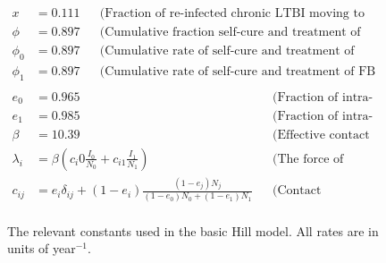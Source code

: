 \documentclass{amsart}
\renewcommand{\(}{\left(}
\renewcommand{\)}{\right)}
\begin{document}
\begin{figure}[h]
\begin{align*}
    x          &= 0.111   &&\text{(Fraction of re-infected chronic LTBI moving to
                                   acute infection)}\\
    \phi       &= 0.897   &&\text{(Cumulative fraction self-cure and treatment of
                                   active disease)}\\
    \phi_0     &= 0.897   &&\text{(Cumulative rate of self-cure and treatment of
                                   USB active disease)}\\
    \phi_1     &= 0.897   &&\text{(Cumulative rate of self-cure and treatment of
                                   FB active disease)}\\
  \end{align*}
  \begin{align*}
    e_{0}      &= 0.965   &&\text{(Fraction of intra-USB preferred contacts)}\\
    e_{1}      &= 0.985   &&\text{(Fraction of intra-FB preferred contacts)}\\
    \beta      &= 10.39   && \text{(Effective contact rate)}\\
    \lambda_i  &= \beta\(c_i0\frac{I_0}{N_0} + c_{i1}\frac{I_1}{N_1}\)
                          &&\text{(The force of infection)}\\
    c_{ij}     &= e_i\delta_{ij} + (1-e_i)\frac{(1-e_j)N_j}
                                               {(1-e_0)N_0 + (1-e_1)N_1}
                          &&\text{(Contact proportion constants)}\\
  \end{align*}
  \caption{The relevant constants used in the basic Hill model. All rates are in
           units of year$^{-1}$.}
  \label{fig:hillConstants}
\end{figure}
\end{document}
